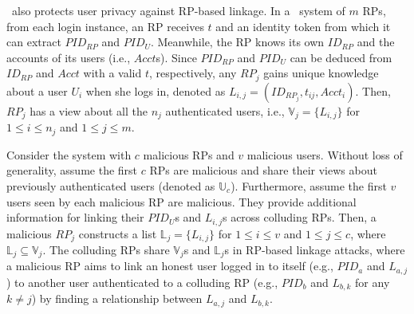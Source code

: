 {{%


\usso~also protects user privacy against RP-based linkage. In a \usso~system of $m$ RPs, from each login instance, an RP receives $t$ %
and an identity token %
from which it can extract $PID_{RP}$ and $PID_U$. Meanwhile, the RP knows its own $ID_{RP}$ and the accounts of its users (i.e., $Acct$s). %
Since $PID_{RP}$ and $PID_U$ can be deduced from $ID_{RP}$ and $Acct$ with a valid $t$, respectively, any $RP_j$ gains unique knowledge about a user $U_i$ when she logs in, denoted as $L_{i, j}=(ID_{RP_j}, t_{ij}, Acct_i)$. Then, $RP_j$ has a view about all the $n_j$ authenticated users, i.e., $\mathbb{V}_j=\{L_{i,j}\}$ for $1 \le i \le n_j$ and $1 \le j \le m$.


Consider the system with $c$ malicious RPs and $v$ malicious users. Without loss of generality, assume the first $c$ RPs are malicious and share their views about previously authenticated users (denoted as $\mathbb{U}_c$). Furthermore, assume the first $v$ users seen by each malicious RP are malicious. They provide additional information for linking their $PID_U$s and $L_{i, j}$s across colluding RPs. Then, a malicious $RP_j$ constructs a list $\mathbb{L}_j=\{L_{i,j}\}$ for $1 \le i \le v$ and $1 \le j \le c$, where $\mathbb{L}_j \subseteq \mathbb{V}_j$.
The colluding RPs share $\mathbb{V}_j$s and $\mathbb{L}_j$s in RP-based linkage attacks, where a malicious RP aims to link an honest user logged in to itself (e.g., $PID_a$ and $L_{a,j}$) to another user authenticated to a colluding RP (e.g., $PID_b$ and $L_{b,k}$ for any $k \neq j$) by finding a relationship between $L_{a,j}$ and $L_{b,k}$.

}}
